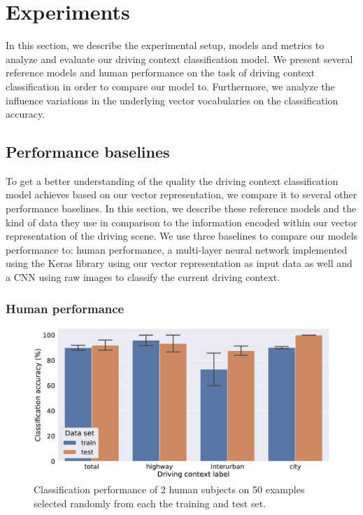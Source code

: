 \section{Experiments}%
\label{sec:experiments_context_classificaiton}

In this section, we describe the experimental setup, models and metrics to analyze and evaluate our driving context classification model.
We present several reference models and human performance on the task of driving context classification in order to compare our model to.
Furthermore, we analyze the influence variations in the underlying vector vocabularies on the classification accuracy.

\subsection{Performance baselines}%
\label{subsec:performance_baselines}

To get a better understanding of the quality the driving context classification model achieves based on our vector representation, we compare it to several other performance baselines.
In this section, we describe these reference models and the kind of data they use in comparison to the information encoded within our vector representation of the driving scene.
We use three baselines to compare our models performance to: human performance, a multi-layer neural network implemented using the Keras library \parencite{Chollet2015keras} using our vector representation as input data as well and a \ac{CNN} using raw images to classify the current driving context.

\subsubsection{Human performance}%
\label{ssubsec:human_performance}

\begin{figure}[t]
    \centering
    \includegraphics[width=1.0\linewidth]{imgs/context_class_human_train_test.eps}
    \caption{Classification performance of \num{2} human subjects on \num{50} examples selected randomly from each the training and test set.}
    \label{fig:context_class_human_train_test}
\end{figure}


